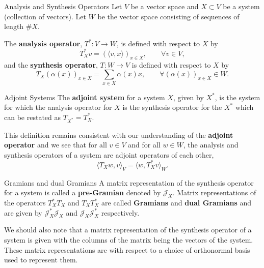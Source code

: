 \documentclass{beamer}
\begin{document}
\begin{frame}{Analysis and Synthesis Operators}
    Let $V$ be a vector space and $X \subset V$ be a system (collection of vectors). Let $W$ be the vector space consisting of sequences of length $\#X$.
    
    The \textbf{analysis operator}, $T^*: V \to W$, is defined with respect to $X$ by 
\begin{equation} \label{analysis}
    T_X^*v = \left(\langle v, x \rangle \right)_{x \in X}, \qquad \forall v \in V,
\end{equation}
and the \textbf{synthesis operator}, $T: W \to V$ is defined with respect to $X$ by
\begin{equation} \label{synthesis}
T_X\left(\alpha(x)\right)_{x \in X} = \sum_{x \in X} \alpha(x) x, \qquad \forall \left(\alpha(x)\right)_{x \in X} \in W.
\end{equation}
\end{frame}

\begin{frame}{Adjoint Systems}
    The \textbf{adjoint system} for a system $X$, given by $X^*$, is the system for which the analysis operator for $X$ is the synthesis operator for the $X^*$ which can be restated as $T_{X^*} = T^*_X$.

    This definition remains consistent with our understanding of the \textbf{adjoint operator} and we see that for all $v \in V$ and for all $ w \in W$, the analysis and synthesis operators of a system are adjoint operators of each other, 
    $$\langle T_Xw, v \rangle_V = \langle w, T_X^*v \rangle_W.$$
\end{frame}

\begin{frame}{Gramians and dual Gramians}
    A matrix representation of the synthesis operator for a system is called a \textbf{pre-Gramian} denoted by $\mathcal{J}_X$. Matrix representations of the operators $T_X^*T_X$ and $T_XT_X^*$ are called \textbf{Gramians} and \textbf{dual Gramians} and are given by $\mathcal{J}^*_X\mathcal{J}_X$ and $\mathcal{J}_X\mathcal{J}^*_X$ respectively.

    We should also note that a matrix representation of the synthesis operator of a system is given with the columns of the matrix being the vectors of the system. These matrix representations are with respect to a choice of orthonormal basis used to represent them.
\end{frame}
\end{document}
